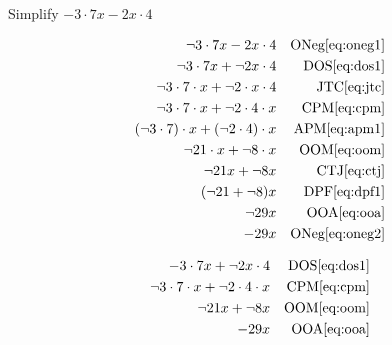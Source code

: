 \documentclass[20150903-160354-rs2.2-MarksMathNotebook.tex]{subfiles}
\begin{document}
\begin{example}[id:20141108-194431] \label{20141108-194431}  \hfill \\

Simplify $- 3\cdot 7x - 2x \cdot 4$

\soln

\solnsteps
\begin{align*}
\neg 3 \cdot 7x - 2x \cdot 4 && \text{ONeg} \eqref{eq:oneg1} \\
\neg 3 \cdot 7x +\neg 2x \cdot 4 && \text{DOS} \eqref{eq:dos1} \\
\neg 3 \cdot 7 \cdot x + \neg 2 \cdot x \cdot 4 && \text{JTC} \eqref{eq:jtc} \\
\neg 3 \cdot 7 \cdot x + \neg 2 \cdot 4 \cdot x && \text{CPM} \eqref{eq:cpm} \\
(\neg 3 \cdot 7) \cdot x + (\neg 2 \cdot 4) \cdot x && \text{APM} \eqref{eq:apm1} \\
\neg 21 \cdot x + \neg 8 \cdot x && \text{OOM} \eqref{eq:oom} \\
\neg 21 x + \neg 8 x && \text{CTJ} \eqref{eq:ctj} \\
(\neg 21 + \neg 8 )x && \text{DPF} \eqref{eq:dpf1} \\
\neg 29x && \text{OOA} \eqref{eq:ooa} \\
-29x && \text{ONeg} \eqref{eq:oneg2}
\end{align*}

\soln

\lesssteps
\begin{align*}
-3 \cdot 7x + \neg 2x \cdot 4 && \text{DOS} \eqref{eq:dos1} \\
\neg 3 \cdot 7 \cdot x + \neg 2 \cdot 4 \cdot x && \text{CPM} \eqref{eq:cpm} \\
\neg 21x + \neg 8x && \text{OOM} \eqref{eq:oom} \\
-29x && \text{OOA} \eqref{eq:ooa}
\end{align*}

\end{example}
\end{document}
